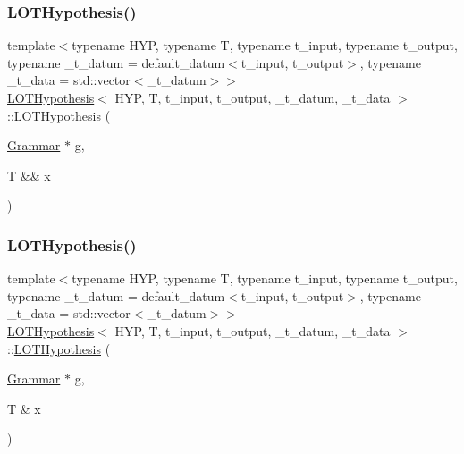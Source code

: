 \mbox{\label{class_l_o_t_hypothesis_abfb19603c9bdda8b8b8c682b6cdc6e03}} 
\subsubsection{\texorpdfstring{L\+O\+T\+Hypothesis()}{LOTHypothesis()}\hspace{0.1cm}{\footnotesize\ttfamily [2/4]}}
{\footnotesize\ttfamily template$<$typename H\+YP, typename T, typename t\+\_\+input, typename t\+\_\+output, typename \+\_\+t\+\_\+datum = default\+\_\+datum$<$t\+\_\+input, t\+\_\+output$>$, typename \+\_\+t\+\_\+data = std\+::vector$<$\+\_\+t\+\_\+datum$>$$>$ \\
\hyperlink{class_l_o_t_hypothesis}{L\+O\+T\+Hypothesis}$<$ H\+YP, T, t\+\_\+input, t\+\_\+output, \+\_\+t\+\_\+datum, \+\_\+t\+\_\+data $>$\+::\hyperlink{class_l_o_t_hypothesis}{L\+O\+T\+Hypothesis} (\begin{DoxyParamCaption}\item[{\hyperlink{class_grammar}{Grammar} $\ast$}]{g,  }\item[{T \&\&}]{x }\end{DoxyParamCaption})\hspace{0.3cm}{\ttfamily [inline]}}

\mbox{\label{class_l_o_t_hypothesis_a3123d5e4e140ca24fdaa568bd2b17644}} 
\subsubsection{\texorpdfstring{L\+O\+T\+Hypothesis()}{LOTHypothesis()}\hspace{0.1cm}{\footnotesize\ttfamily [3/4]}}
{\footnotesize\ttfamily template$<$typename H\+YP, typename T, typename t\+\_\+input, typename t\+\_\+output, typename \+\_\+t\+\_\+datum = default\+\_\+datum$<$t\+\_\+input, t\+\_\+output$>$, typename \+\_\+t\+\_\+data = std\+::vector$<$\+\_\+t\+\_\+datum$>$$>$ \\
\hyperlink{class_l_o_t_hypothesis}{L\+O\+T\+Hypothesis}$<$ H\+YP, T, t\+\_\+input, t\+\_\+output, \+\_\+t\+\_\+datum, \+\_\+t\+\_\+data $>$\+::\hyperlink{class_l_o_t_hypothesis}{L\+O\+T\+Hypothesis} (\begin{DoxyParamCaption}\item[{\hyperlink{class_grammar}{Grammar} $\ast$}]{g,  }\item[{T \&}]{x }\end{DoxyParamCaption})\hspace{0.3cm}{\ttfamily [inline]}}

